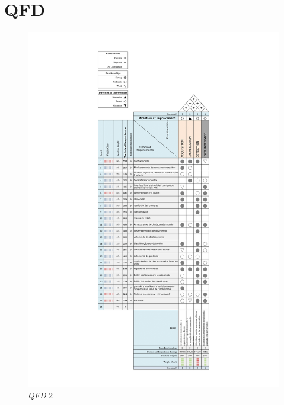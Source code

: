 
\chapter{QFD}
\label{Append:qfd}
\begin{figure}[H]
	\centering
	\includegraphics[scale=0.255]{Figures/qfd2-1.png}
	\caption{\textit{QFD} 2}
	\label{fig:qfd2}
\end{figure}